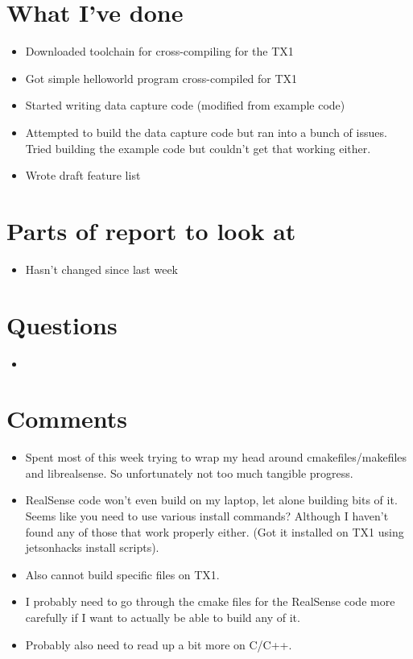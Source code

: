 \documentclass[12pt,a4paper]{article}
\begin{document}
\author{Katrina Ashton}


\pagestyle{fancy}
\fancyhf{}
\rhead{\thepage}

\section{What I've done}
\begin{itemize}
\item{Downloaded toolchain for cross-compiling for the TX1}
\item{Got simple helloworld program cross-compiled for TX1}
\item{Started writing data capture code (modified from example code)}
\item{Attempted to build the data capture code but ran into a bunch of issues. Tried building the example code but couldn't get that working either.}
\item{Wrote draft feature list}
\end{itemize}

\section{Parts of report to look at}
\begin{itemize}
\item{Hasn't changed since last week}
\end{itemize}

\section{Questions}
\begin{itemize}
\item{}
\end{itemize}

\section{Comments}
\begin{itemize}
\item{Spent most of this week trying to wrap my head around cmakefiles/makefiles and librealsense. So unfortunately not too much tangible progress.}
\item{RealSense code won't even build on my laptop, let alone building bits of it. Seems like you need to use various install commands? Although I haven't found any of those that work properly either. (Got it installed on TX1 using jetsonhacks install scripts).}
\item{Also cannot build specific files on TX1.}
\item{I probably need to go through the cmake files for the RealSense code more carefully if I want to actually be able to build any of it.}
\item{Probably also need to read up a bit more on C/C++.}
\end{itemize}
\end{document}
